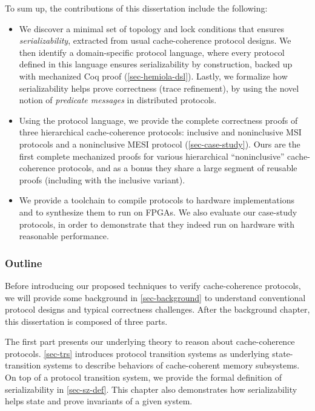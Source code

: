 To sum up, the contributions of this dissertation include the following:
\begin{itemize}
\item We discover a minimal set of topology and lock conditions that ensures \emph{serializability}, extracted from usual cache-coherence protocol designs.
  We then identify a domain-specific protocol language, where every protocol defined in this language ensures serializability by construction, backed up with mechanized Coq proof (\autoref{sec-hemiola-dsl}).
  Lastly, we formalize how serializability helps prove correctness (trace refinement), by using the novel notion of \emph{predicate messages} in distributed protocols.
\item Using the protocol language, we provide the complete correctness proofs of three hierarchical cache-coherence protocols: inclusive and noninclusive MSI protocols and a noninclusive MESI protocol (\autoref{sec-case-study}).
  Ours are the first complete mechanized proofs for various hierarchical ``noninclusive'' cache-coherence protocols, and as a bonus they share a large segment of reusable proofs (including with the inclusive variant).
\item We provide a toolchain to compile \hemiola{} protocols to hardware implementations and to synthesize them to run on FPGAs.
  We also evaluate our case-study protocols, in order to demonstrate that they indeed run on hardware with reasonable performance.
\end{itemize}

\subsubsection{Outline}

Before introducing our proposed techniques to verify cache-coherence protocols, we will provide some background in \autoref{sec-background} to understand conventional protocol designs and typical correctness challenges.
After the background chapter, this dissertation is composed of three parts.

The first part presents our underlying theory to reason about cache-coherence protocols.
\autoref{sec-trs} introduces protocol transition systems as underlying state-transition systems to describe behaviors of cache-coherent memory subsystems.
On top of a protocol transition system, we provide the formal definition of serializability in \autoref{sec-sz-def}.
This chapter also demonstrates how serializability helps state and prove invariants of a given system.

